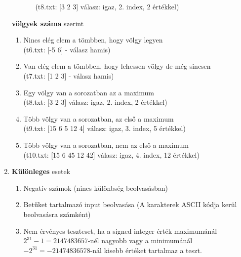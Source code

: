 \documentclass[12pt,a4paper]{article}			%
\begin{document}
\begin{enumerate}
\begin{enumerate}
\begin{itemize}[label={}]
					(t8.txt: [3 2 3] válasz: igaz, 2. index, 2 értékkel)
				\end{itemize}
			\end{enumerate}
			\textbf{völgyek száma} szerint
				\begin{enumerate}
					\item Nincs elég elem a tömbben, hogy völgy legyen\\
					(t6.txt: [-5 6] - válasz hamis)
					\item Van elég elem a tömbben, hogy lehessen völgy de még sincsen\\
					(t7.txt: [1 2 3] - válasz hamis)
					\item Egy völgy van a sorozatban az a maximum\\
					(t8.txt: [3 2 3] válasz: igaz, 2. index, 2 értékkel)
					\item Több völgy van a sorozatban, az első a maximum\\
					(t9.txt: [15 6 5 12 4] válasz: igaz, 3. index, 5 értékkel)
					\item Több völgy van a sorozatban, nem az első a maximum\\
					(t10.txt: [15 6 45 12 42] válasz: igaz, 4. index, 12 értékkel)
				\end{enumerate}
			\item \textbf{Különleges} esetek
				\begin{enumerate}
					\item Negatív számok (nincs különbség beolvasásban)
					\item Betűket tartalmazó input beolvasása (A karakterek ASCII kódja kerül beolvasásra számként)
					\item Nem érvényes teszteset, ha a signed integer érték maximumánál $2^{31}-1=2147483657$-nél nagyobb vagy a minimumánál $-2^{31}=-21474836578$-nál kisebb értéket tartalmaz a teszt.
				\end{enumerate} 
		\end{enumerate}
\end{document}
